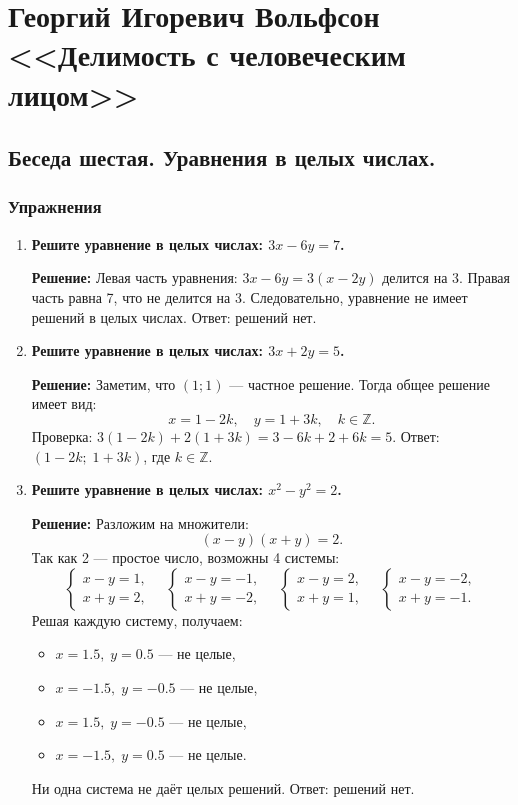 \documentclass[12pt, a4paper]{article}
\begin{document}
\section*{Георгий Игоревич Вольфсон <<Делимость с человеческим лицом>>}

\subsection*{Беседа шестая. Уравнения в целых числах.}

\subsubsection*{Упражнения}

\begin{enumerate}[label=\arabic*., wide=0pt, leftmargin=*]

\item \textbf{Решите уравнение в целых числах: \(3x - 6y = 7\).}

\textbf{Решение:}
Левая часть уравнения: \(3x - 6y = 3(x - 2y)\) делится на 3. Правая часть равна 7, что не делится на 3. Следовательно, уравнение не имеет решений в целых числах.
Ответ: решений нет.

\item \textbf{Решите уравнение в целых числах: \(3x + 2y = 5\).}

\textbf{Решение:}
Заметим, что \((1;1)\) — частное решение. Тогда общее решение имеет вид:
\[
x = 1 - 2k,\quad y = 1 + 3k,\quad k \in \mathbb{Z}.
\]
Проверка: \(3(1-2k) + 2(1+3k) = 3 - 6k + 2 + 6k = 5\).
Ответ: \((1-2k;\; 1+3k)\), где \(k \in \mathbb{Z}\).

\item \textbf{Решите уравнение в целых числах: \(x^2 - y^2 = 2\).}

\textbf{Решение:}
Разложим на множители:
\[
(x-y)(x+y) = 2.
\]
Так как 2 — простое число, возможны 4 системы:
\[
\begin{cases}
x-y = 1,\\
x+y = 2,
\end{cases}
\quad
\begin{cases}
x-y = -1,\\
x+y = -2,
\end{cases}
\quad
\begin{cases}
x-y = 2,\\
x+y = 1,
\end{cases}
\quad
\begin{cases}
x-y = -2,\\
x+y = -1.
\end{cases}
\]
Решая каждую систему, получаем:
\begin{itemize}
\item \(x = 1.5,\; y = 0.5\) — не целые,
\item \(x = -1.5,\; y = -0.5\) — не целые,
\item \(x = 1.5,\; y = -0.5\) — не целые,
\item \(x = -1.5,\; y = 0.5\) — не целые.
\end{itemize}
Ни одна система не даёт целых решений.
Ответ: решений нет.


\end{enumerate}
\end{document}
